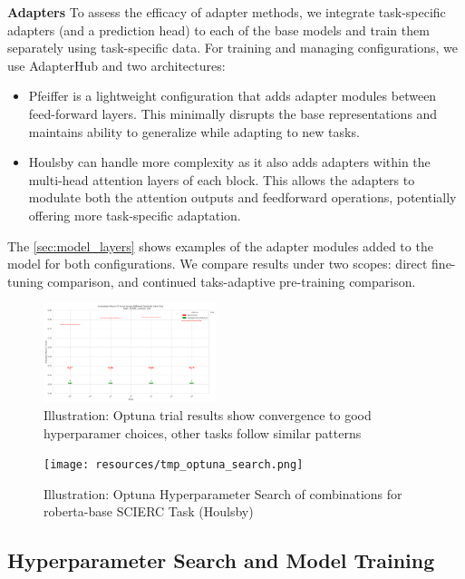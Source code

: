 \documentclass[10pt,twocolumn,letterpaper]{article}
\begin{document}
\textbf{Adapters}  To assess the efficacy of adapter methods, we integrate task-specific adapters (and a prediction head) to each of the base models and train them separately using task-specific data. For training and managing configurations, we use AdapterHub \cite{adapterhub_overview} and two architectures: 
\begin{itemize}
\item Pfeiffer \cite{pfeiffer2020adapterhub} is a lightweight configuration that adds adapter modules between feed-forward layers. This minimally disrupts the base representations and maintains ability to generalize while adapting to new tasks. 
\item Houlsby \cite{houlsby2019parameter} can handle more complexity as it also adds adapters within the multi-head attention layers of each block. This allows the adapters to modulate both the attention outputs and feedforward operations, potentially offering more task-specific adaptation.
\end{itemize}
The \ref{sec:model_layers} shows examples of the adapter modules added to the model for both configurations. We compare results under two scopes: direct fine-tuning comparison, and continued taks-adaptive pre-training comparison.


\begin{figure}[h]
    \centering 
    \includegraphics[width=0.45\textwidth]{resources/SCIERC/v01/evaluation_macro_f1_across_seeds.png}
    \caption{Illustration: Optuna trial results show convergence to good hyperparamer choices, other tasks follow similar patterns}
    \label{fig:optuna_search_trials}
\end{figure}

\begin{figure}[h]
    \centering 
    \texttt{[image: resources/tmp\_optuna\_search.png]}
    \caption{Illustration: Optuna Hyperparameter Search of combinations for roberta-base SCIERC Task (Houlsby)}
    \label{fig:optuna_search}
\end{figure}

\subsection{Hyperparameter Search and Model Training} 
\end{document}
